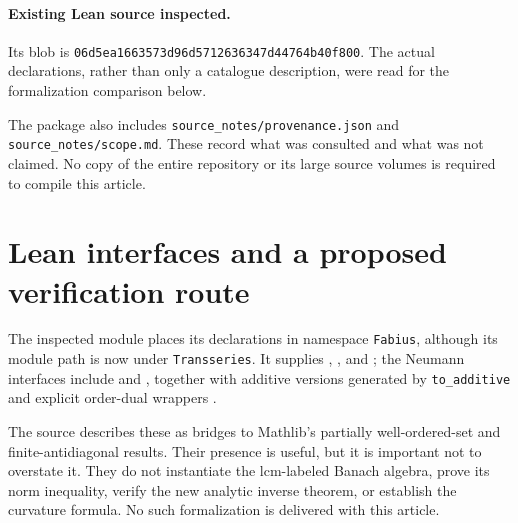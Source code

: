\documentclass[11pt,a4paper]{article}
\numberwithin{equation}{section}
\theoremstyle{definition}
\theoremstyle{remark}
\begin{document}
\paragraph{Existing Lean source inspected.}
{\small{}}\par
Its blob is
\texttt{06d5ea1663573d96d5712636347d44764b40f800}.
The actual declarations, rather than only a catalogue description,
were read for the formalization comparison below.


The package also includes \texttt{source\_notes/provenance.json} and
\texttt{source\_notes/scope.md}. These record what was consulted and what
was not claimed. No copy of the entire repository or its large source
volumes is required to compile this article.

\section{Lean interfaces and a proposed verification route}\label{app:lean}

The inspected module places its declarations in namespace
\texttt{Fabius}, although its module path is now under
\texttt{Transseries}. It supplies
,
, and
; the Neumann interfaces include
 and
, together with additive
versions generated by \texttt{to\_additive} and explicit order-dual
wrappers \cite{repolean}.

The source describes these as bridges to Mathlib's partially
well-ordered-set and finite-antidiagonal results. Their presence is
useful, but it is important not to overstate it. They do not instantiate
the lcm-labeled Banach algebra, prove its norm inequality, verify the
new analytic inverse theorem, or establish the curvature formula.
No such formalization is delivered with this article.
\end{document}

